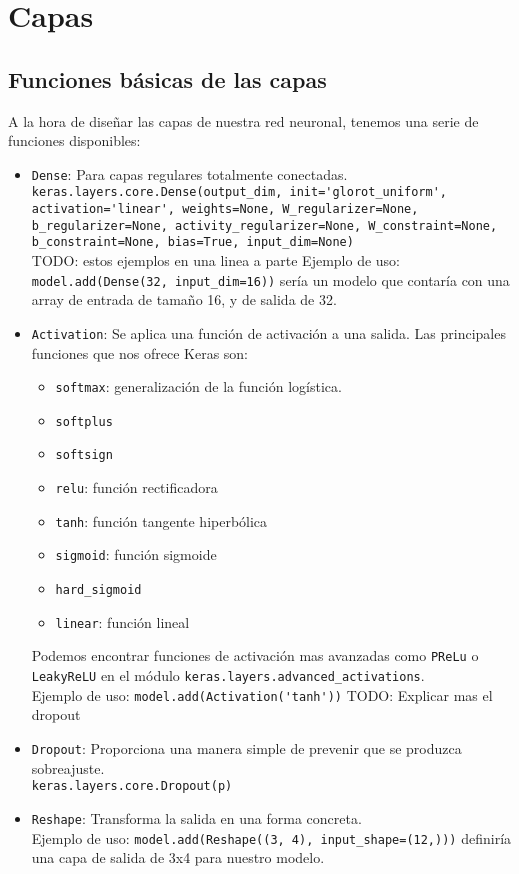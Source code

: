 \section{Capas}
\subsection{Funciones básicas de las capas}
A la hora de diseñar las capas de nuestra red neuronal, tenemos una serie de funciones disponibles:
\begin{itemize}
\item \lstinline{Dense}: Para capas regulares totalmente conectadas.\\
\lstinline{keras.layers.core.Dense(output_dim, init='glorot_uniform', activation='linear', weights=None, W_regularizer=None, b_regularizer=None, activity_regularizer=None, W_constraint=None, b_constraint=None, bias=True, input_dim=None)}\\
TODO: estos ejemplos en una linea a parte
Ejemplo de uso: \lstinline{model.add(Dense(32, input_dim=16))} sería un modelo que contaría con una array de entrada de tamaño 16, y de salida de 32.
\item \lstinline{Activation}: Se aplica una función de activación a una salida. Las principales funciones que nos ofrece Keras son:
\begin{itemize}
\item \lstinline{softmax}: generalización de la función logística.
\item \lstinline{softplus}
\item \lstinline{softsign}
\item \lstinline{relu}: función rectificadora
\item \lstinline{tanh}: función tangente hiperbólica
\item \lstinline{sigmoid}: función sigmoide
\item \lstinline{hard_sigmoid}
\item \lstinline{linear}: función lineal
\end{itemize}
Podemos encontrar funciones de activación mas avanzadas como \lstinline{PReLu} o \lstinline{LeakyReLU} en el módulo \lstinline{keras.layers.advanced_activations}.\\
Ejemplo de uso: \lstinline{model.add(Activation('tanh'))}
TODO: Explicar mas el dropout
\item \lstinline{Dropout}: Proporciona una manera simple de prevenir que se produzca sobreajuste.\\
\lstinline{keras.layers.core.Dropout(p)}
\item \lstinline{Reshape}: Transforma la salida en una forma concreta.\\
Ejemplo de uso: \lstinline{model.add(Reshape((3, 4), input_shape=(12,)))} definiría una capa de salida de 3x4 para nuestro modelo.
\end{itemize}

